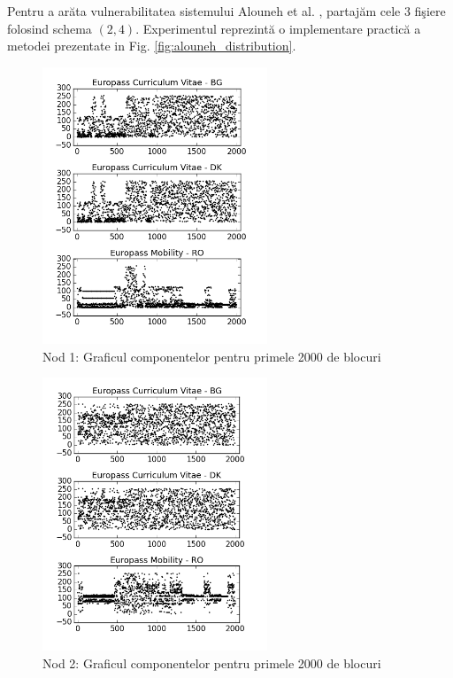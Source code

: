 \documentclass{llncs}
\begin{document}
Pentru a ar\u{a}ta vulnerabilitatea sistemului Alouneh et al. {\cite{AAMK:2013}}, partaj\u{a}m cele $3$ fi\c{s}iere folosind schema $(2, 4)$. Experimentul reprezint\u{a} o implementare practic\u{a} a metodei prezentate in Fig. {\ref{fig:alouneh_distribution}}.



\begin{figure}[H]
\begin{center}{}
\includegraphics[width=0.6\textwidth]{img/db1.png}    %
\caption{Nod 1: Graficul componentelor pentru primele 2000 de blocuri} 
\label{fig:db1}
\end{center}
\end{figure}

\begin{figure}
\begin{center}
\includegraphics[width=0.6\textwidth]{img/db2.png}    %
\caption{Nod 2: Graficul componentelor pentru primele 2000 de blocuri} 
\label{fig:db2}
\end{center}
\end{figure}
\end{document}
